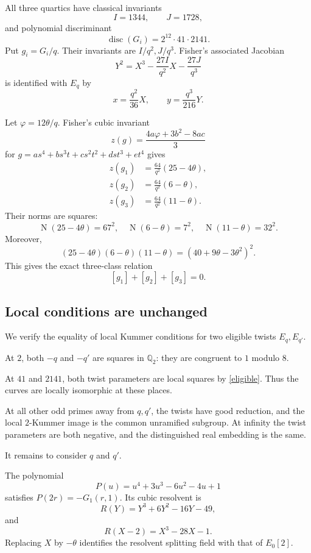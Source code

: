 \documentclass[11pt]{article}
\newcommand{\Q}{\mathbb Q}
\newcommand{\Nm}{\operatorname{N}}
\begin{document}
All three quartics have classical invariants
\[
I=1344,\qquad J=1728,
\]
and polynomial discriminant
\[
\operatorname{disc}(G_i)=2^{12}\cdot41\cdot2141.
\]
Put $g_i=G_i/q$. Their invariants are
$I/q^2,J/q^3$.
Fisher's associated Jacobian
\[
Y^2=X^3-\frac{27I}{q^2}X-\frac{27J}{q^3}
\]
is identified with $E_q$ by
\[
x=\frac{q^2}{36}X,\qquad
y=\frac{q^3}{216}Y.
\]

Let $\varphi=12\theta/q$.
Fisher's cubic invariant
\[
z(g)=\frac{4a\varphi+3b^2-8ac}{3}
\]
for $g=as^4+bs^3t+cs^2t^2+dst^3+et^4$
gives
\begin{equation}\label{zinvariants}
\begin{aligned}
z(g_1)&=\frac{64}{q^2}(25-4\theta),\\
z(g_2)&=\frac{64}{q^2}(6-\theta),\\
z(g_3)&=\frac{64}{q^2}(11-\theta).
\end{aligned}
\end{equation}
Their norms are squares:
\[
\Nm(25-4\theta)=67^2,\quad
\Nm(6-\theta)=7^2,\quad
\Nm(11-\theta)=32^2.
\]
Moreover,
\begin{equation}\label{cubicproduct}
(25-4\theta)(6-\theta)(11-\theta)
=(40+9\theta-3\theta^2)^2.
\end{equation}
This gives the exact three-class relation
\[
[g_1]+[g_2]+[g_3]=0.
\]

\subsection{Local conditions are unchanged}

We verify the equality of local Kummer conditions
for two eligible twists $E_q,E_{q'}$.

At $2$, both $-q$ and $-q'$ are squares in $\Q_2$:
they are congruent to $1$ modulo $8$.

At $41$ and $2141$, both twist parameters are
local squares by \eqref{eligible}.
Thus the curves are locally isomorphic at these places.

At all other odd primes away from $q,q'$,
the twists have good reduction, and the local
$2$-Kummer image is the common unramified subgroup.
At infinity the twist parameters are both negative,
and the distinguished real embedding is the same.

It remains to consider $q$ and $q'$.

The polynomial
\[
P(u)=u^4+3u^3-6u^2-4u+1
\]
satisfies $P(2r)=-G_1(r,1)$.
Its cubic resolvent is
\[
R(Y)=Y^3+6Y^2-16Y-49,
\]
and
\[
R(X-2)=X^3-28X-1.
\]
Replacing $X$ by $-\theta$ identifies the resolvent
splitting field with that of $E_0[2]$.
\end{document}
